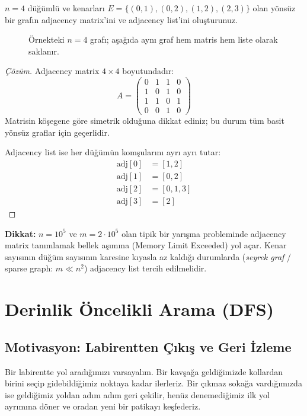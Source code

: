 \begin{example}
$n = 4$ düğümlü ve kenarları $E = \{(0,1), (0,2), (1,2), (2,3)\}$ olan yönsüz bir grafın adjacency matrix'ini ve adjacency list'ini oluşturunuz.

\begin{figure}[ht]
\centering
{}
\caption{Örnekteki $n = 4$ grafı; aşağıda aynı graf hem matris hem liste olarak
saklanır.}
\end{figure}

\begin{proof}[Çözüm]
Adjacency matrix $4 \times 4$ boyutundadır:
\[
A = \begin{pmatrix}
0 & 1 & 1 & 0 \\
1 & 0 & 1 & 0 \\
1 & 1 & 0 & 1 \\
0 & 0 & 1 & 0
\end{pmatrix}
\]
Matrisin köşegene göre simetrik olduğuna dikkat ediniz; bu durum tüm basit yönsüz graflar için geçerlidir.

Adjacency list ise her düğümün komşularını ayrı ayrı tutar:
\begin{align*}
\text{adj}[0] &= [1, 2] \\
\text{adj}[1] &= [0, 2] \\
\text{adj}[2] &= [0, 1, 3] \\
\text{adj}[3] &= [2]
\end{align*}
\end{proof}
\end{example}

\textbf{Dikkat:} $n = 10^5$ ve $m = 2 \cdot 10^5$ olan tipik bir yarışma probleminde adjacency matrix tanımlamak bellek aşımına (Memory Limit Exceeded) yol açar. Kenar sayısının düğüm sayısının karesine kıyasla az kaldığı durumlarda (\emph{seyrek graf} / sparse graph: $m \ll n^2$) adjacency list tercih edilmelidir.

\section{Derinlik Öncelikli Arama (DFS)}

\subsection{Motivasyon: Labirentten Çıkış ve Geri İzleme}
Bir labirentte yol aradığımızı varsayalım. Bir kavşağa geldiğimizde kollardan birini seçip gidebildiğimiz noktaya kadar ilerleriz. Bir çıkmaz sokağa vardığımızda ise geldiğimiz yoldan adım adım geri çekilir, henüz denemediğimiz ilk yol ayrımına döner ve oradan yeni bir patikayı keşfederiz.

